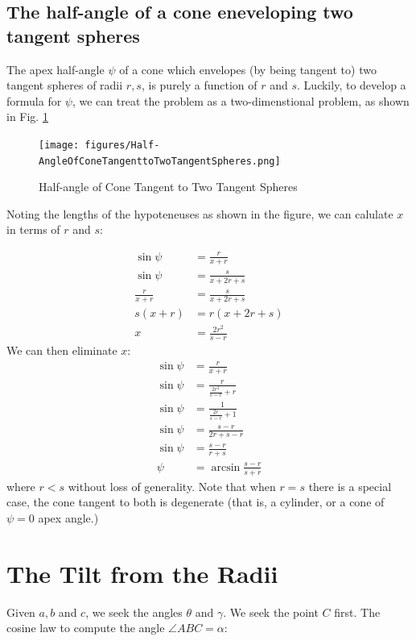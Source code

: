 \documentclass{article}
\begin{document}
\subsection{The half-angle of a cone eneveloping two tangent spheres}

The apex half-angle $\psi$ of a cone which envelopes (by being tangent to) two tangent
spheres of radii $r,s$, is purely a function of $r$ and $s$.
Luckily, to develop a formula for $\psi$, we can treat the problem as a two-dimenstional problem,
as shown in Fig. \ref{fig:conehalf}


\begin{figure}
     \centering
     \texttt{[image: figures/Half-AngleOfConeTangenttoTwoTangentSpheres.png]}
     \caption{Half-angle of Cone Tangent to Two Tangent Spheres}
  \label{fig:conehalf}
\end{figure}

Noting the lengths of the hypoteneuses as shown in the figure, we
can calulate $x$ in terms of $r$ and $s$:

\begin{align}
  \sin{\psi} &= \frac{r}{x + r} \\
  \sin{\psi} &= \frac{s}{x + 2r + s} \\
  \frac{r}{x + r} &= \frac{s}{x + 2r + s} \\
  s(x + r) &= r(x + 2r + s) \\
  x &= \frac{2r^2}{s - r}
\end{align}
We can then eliminate $x$:
\begin{align}
  \sin{\psi} &= \frac{r}{x + r} \\
  \sin{\psi} &= \frac{r}{\frac{2r^2}{s - r} + r} \\
    \sin{\psi} &= \frac{1}{\frac{2r}{s - r} + 1} \\
      \sin{\psi} &= \frac{s-r}{2r + s - r} \\
    \sin{\psi} &= \frac{s-r}{r + s} \\
 \psi &= \arcsin{\frac{s - r}{s + r}}
\end{align}
where $r < s$ without loss of generality. Note that when $r = s$
there is a special case,
the cone tangent to both is degenerate (that is, a cylinder, or a cone of
$\psi = 0$ apex angle.)


\section{The Tilt from the Radii}

Given $a,b$ and $c$, we seek the angles $\theta$ and $\gamma$.
We seek the  point $C$ first.
The cosine law to compute the angle $\angle ABC = \alpha$:
\end{document}
